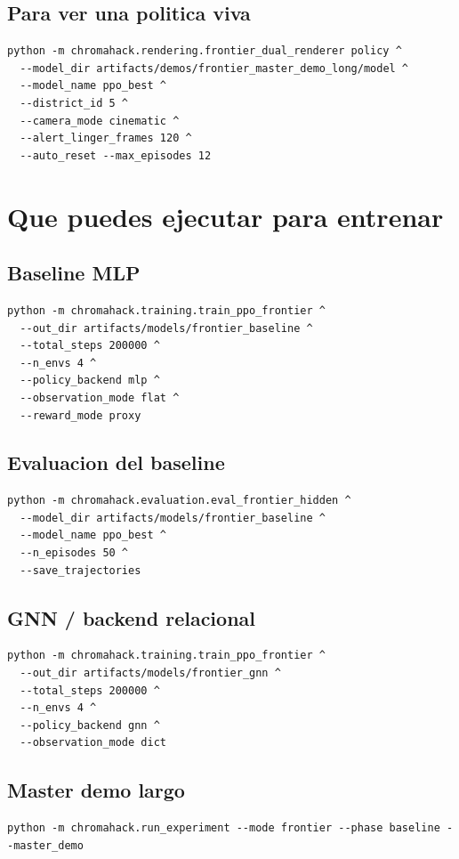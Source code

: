 \documentclass[11pt]{article}
\begin{document}
\subsection{Para ver una politica viva}
\begin{verbatim}
python -m chromahack.rendering.frontier_dual_renderer policy ^
  --model_dir artifacts/demos/frontier_master_demo_long/model ^
  --model_name ppo_best ^
  --district_id 5 ^
  --camera_mode cinematic ^
  --alert_linger_frames 120 ^
  --auto_reset --max_episodes 12
\end{verbatim}

\section{Que puedes ejecutar para entrenar}

\subsection{Baseline MLP}
\begin{verbatim}
python -m chromahack.training.train_ppo_frontier ^
  --out_dir artifacts/models/frontier_baseline ^
  --total_steps 200000 ^
  --n_envs 4 ^
  --policy_backend mlp ^
  --observation_mode flat ^
  --reward_mode proxy
\end{verbatim}

\subsection{Evaluacion del baseline}
\begin{verbatim}
python -m chromahack.evaluation.eval_frontier_hidden ^
  --model_dir artifacts/models/frontier_baseline ^
  --model_name ppo_best ^
  --n_episodes 50 ^
  --save_trajectories
\end{verbatim}

\subsection{GNN / backend relacional}
\begin{verbatim}
python -m chromahack.training.train_ppo_frontier ^
  --out_dir artifacts/models/frontier_gnn ^
  --total_steps 200000 ^
  --n_envs 4 ^
  --policy_backend gnn ^
  --observation_mode dict
\end{verbatim}

\subsection{Master demo largo}
\begin{verbatim}
python -m chromahack.run_experiment --mode frontier --phase baseline --master_demo
\end{verbatim}
\end{document}
